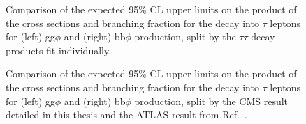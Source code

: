 \begin{figure}[!hbtp]
\centering
\caption{Comparison of the expected 95\% CL upper limits on the product of the cross sections and branching fraction for the decay into $\tau$ leptons for (left) gg$\phi$ and (right) bb$\phi$ production, split by the $\tau\tau$ decay products fit individually.}
\label{fig:model_independent_limits_by_channel}
\end{figure}

\begin{figure}[!hbtp]
\centering
\caption{Comparison of the expected 95\% CL upper limits on the product of the cross sections and branching fraction for the decay into $\tau$ leptons for (left) gg$\phi$ and (right) bb$\phi$ production, split by the CMS result detailed in this thesis and the ATLAS result from Ref.~\cite{ATLAS:2020zms}.}
\label{fig:model_independent_limits_by_channel}
\end{figure}

